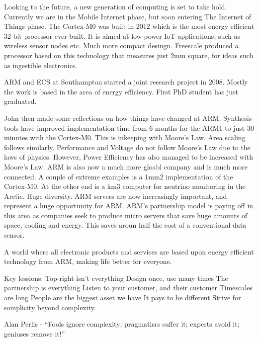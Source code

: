 \documentclass{elec6049Report}     %
\begin{document}
Looking to the future, a new generation of computing is set to take hold. Currently we are in the Mobile Internet phase, but soon entering The Internet of Things phase. The Cortex-M0 was built in 2012 which is the most energy efficient 32-bit processor ever built. It is aimed at low power IoT applications, such as wireless sensor nodes etc. Much more compact desingn. Freescale produced a processor based on this technology that measures just 2mm square, for ideas such as ingestible electronics.

ARM and ECS at Southampton started a joint research project in 2008. Mostly the work is based in the area of energy efficiency. First PhD student has just graduated.

John then made some reflections on how things have changed at ARM. Synthesis tools have improved implementation time from 6 months for the ARM1 to just 30 minutes with the Cortex-M0. This is inkeeping with Moore's Law. Area scaling follows similarly. Performance and Voltage do not follow Moore's Law due to the laws of physics. However, Power Efficiency has also managed to be increased with Moore's Law. ARM is also now a much more gloabl company and is much more connected. A couple of extreme examples is a 1mm2 implementation of the Cortex-M0. At the other end is a km3 computer for neutrino monitoring in the Arctic. Huge diversity. ARM servers are now increasingly important, and represent a huge opportunity for ARM. ARM's partnership model is paying off in this area as companies seek to produce micro servers that save huge amounts of space, cooling and energy. This saves aroun half the cost of a conventional data sensor.

A world where all electronic products and services are based upon energy efficient technology from ARM, making life better for everyone.

Key lessions:
Top-right isn't everything
Design once, use many times
The partnership is everything
Listen to your customer, and their customer
Timescales are long
People are the biggest asset we have
It pays to be different
Strive for somplicity beyond complexity.

Alan Perlis - ``Fools ignore complexity; pragmatisrs suffer it; experts avoid it; geniuses remove it!''
\end{document}
